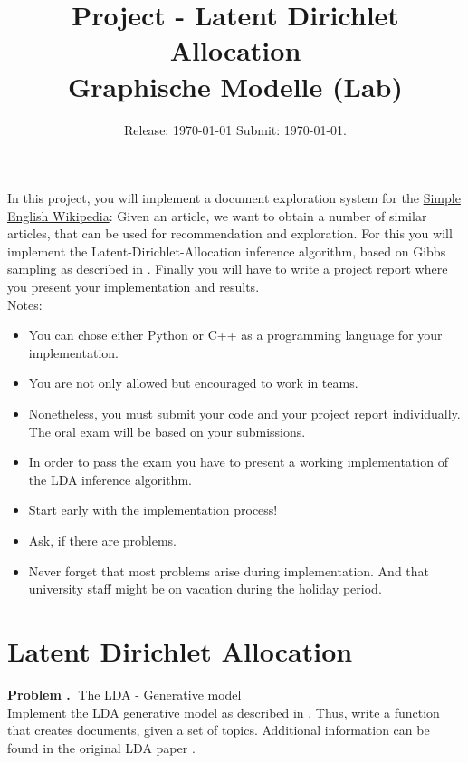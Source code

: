 \documentclass[10pt]{article}
\newcounter{problemCounter}
\newenvironment{problem}[1]
{
	\vspace{0.5cm}
	\refstepcounter{problemCounter}\label{#1}
	\noindent \textbf{Problem \theproblemCounter.$\;$} 
}{}
\begin{document}
 
\title{ Project - Latent Dirichlet Allocation \\
	Graphische Modelle (Lab)}
\author{Release: \today \; Submit: \AdvanceDate[32]\today.\\}
\date{}
\maketitle

In this project, you will implement a document exploration system for the \href{https://simple.wikipedia.org/wiki/Main_Page}{Simple English Wikipedia}\cite{url:sew}: Given an article, we want to obtain a number of similar articles, that can be used for recommendation and exploration. For this you will implement the Latent-Dirichlet-Allocation inference algorithm, based on Gibbs sampling as described in \cite{heinrich:pefta}. Finally you will have to write a project report where you present your implementation and results. \\

Notes:
\begin{itemize}
	\item You can chose either Python or C++ as a programming language for your implementation.
	\item You are not only allowed but encouraged to work in teams.
	\item Nonetheless, you must submit your code and your project report individually. The oral exam will be based on your submissions.
	\item In order to pass the exam you have to present a working implementation of the LDA inference algorithm.
	\item Start early with the implementation process!
	\item Ask, if there are problems.
	\item Never forget that most problems arise during implementation. And that university staff might be on vacation during the holiday period.
\end{itemize}

\section{Latent Dirichlet Allocation}
\begin{problem}
	TThe LDA - Generative model \\
	Implement the LDA generative model as described in \cite{heinrich:pefta}. Thus, write a function that creates documents, given a set of topics. Additional information can be found in the original LDA paper \cite{blei:lda}.
\end{problem}
\end{document}
